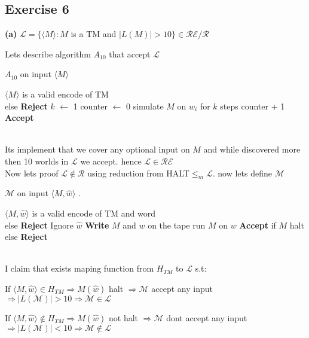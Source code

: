 \documentclass[12pt]{article}
\begin{document}
\subsection*{Exercise 6}
\begin{center}
\textbf{(a)} $\mathcal{L} = \{\langle M\rangle : M $ is a TM and $|L(M)| > 10\} \in  \mathcal{RE/R}$
\end{center} 

Lets describe algorithm $A_{10}$ that accept $\mathcal{L}$
\begin{algorithm}
\caption{  $A_{10}$ on input $\langle M\rangle$ }\label{alg:cap}
\begin{algorithmic}
\Require $\langle M\rangle$ is a valid encode of TM\\ else \textbf{Reject} 
\State $k$ $\leftarrow$ 1
\State counter $\leftarrow$ 0
\State  simulate $M$ on $w_i$
for $k$ steps
\State counter + 1
\EndIf
\EndFor
{} \textbf{Accept}
\EndIf
\EndWhile
\end{algorithmic}
\end{algorithm}
\\Its implement that we cover any optional input on $M$ and while discovered more then 10 worlds in $\mathcal{L}$ we accept. hence $\mathcal{L} \in \mathcal{RE}$
\\Now  lets proof $\mathcal{L}\notin \mathcal{R}$ using reduction from HALT$\leq_m \mathcal{L}$. now lets define $\mathcal{M}$ 
\begin{algorithm}
\caption{ $\mathcal{M}$ on input $\langle M,\hat{w}\rangle$ .}\label{alg:cap}
\begin{algorithmic}
\Require $\langle M,\hat{w}\rangle$ is a valid encode of TM and word\\ else \textbf{Reject} 
\State Ignore $\hat{w}$
\State \textbf{Write} $M$ and $w$ on the tape
\State run $M$ on $w$ \textbf{Accept} if $M$ halt
\\ else \textbf{Reject}
\end{algorithmic}
\end{algorithm}
\\I claim that exists maping function from $H_{TM}$ to $\mathcal{L}$   s.t:
\begin{list}{•}{}
\item If $\langle M,\hat{w}\rangle \in H_{TM} \Rightarrow M(\hat{w})$ halt $\Rightarrow\mathcal{M}$ accept any input $ \Rightarrow  |L(\mathcal{M})|>10\Rightarrow \mathcal{M}\in \mathcal{L} $
\item If $\langle M,\hat{w}\rangle \notin H_{TM} \Rightarrow M(\hat{w})$ not halt $\Rightarrow\mathcal{M}$ dont  accept any input $ \Rightarrow  |L(\mathcal{M})|<10\Rightarrow \mathcal{M}\notin \mathcal{L} $
\end{list}
\end{document}
